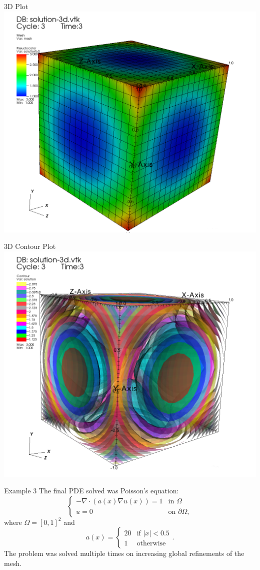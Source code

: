 \documentclass[9pt]{beamer}
\newcommand{\abs}[1]{\left\vert#1\right\vert}
\newcommand{\grad}{\nabla}
\begin{document}
\begin{frame}{3D Plot}
	\centering
	\includegraphics[scale=1]{Solu2-3d.png}
\end{frame}

\begin{frame}{3D Contour Plot}
	\centering
	\includegraphics[scale=1]{Solu2-3dcon.png}
\end{frame}

\begin{frame}{Example 3}
	The final PDE solved was Poisson's equation:
	$$
	\begin{cases}
	-\grad \cdot(a(x)\grad u(x)) = 1 &\text{in }\Omega\\
	u = 0 & \text{on }\partial\Omega,
	\end{cases}
	$$
	where $\Omega = [0,1]^2$ and 
	$$
		a(x) = \begin{cases}
		20 & \text{if }\abs{x} < 0.5\\
		1 & \text{otherwise}
		\end{cases}.
	$$ 
	The problem was solved multiple times on increasing global refinements of the mesh.
\end{frame}
\end{document}
